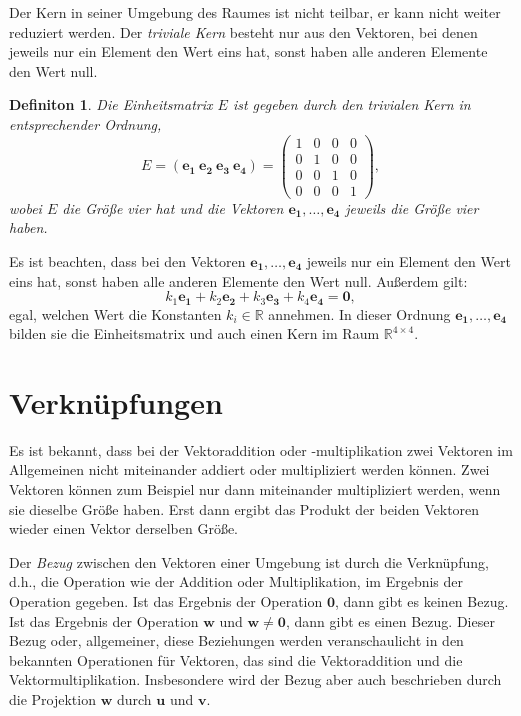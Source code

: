 \documentclass{report}
\newtheorem{definition}{Definiton}[section]
\numberwithin{equation}{section}
\begin{document}
Der Kern in seiner Umgebung des Raumes ist nicht teilbar, er kann nicht weiter reduziert werden. Der \textit{triviale Kern} besteht nur aus den Vektoren, bei denen jeweils nur ein Element den Wert eins hat, sonst haben alle anderen Elemente den Wert null.
\begin{definition}
	Die Einheitsmatrix $E$ ist gegeben durch den trivialen Kern in entsprechender Ordnung, $$ E = (\boldsymbol{e_1} \: \boldsymbol{e_2} \: \boldsymbol{e_3} \: \boldsymbol{e_4}) = 
	\begin{pmatrix}
		1 & 0 & 0 & 0 \\
		0 & 1 & 0 & 0 \\
		0 & 0 & 1 & 0 \\
		0 & 0 & 0 & 1
	\end{pmatrix},$$
wobei $E$ die Größe vier hat und die Vektoren $\boldsymbol{e_1}, \ldots, \boldsymbol{e_4}$  jeweils die Größe vier haben.
\end{definition}
Es ist beachten, dass bei den Vektoren $\boldsymbol{e_1}, \ldots, \boldsymbol{e_4}$ jeweils nur ein Element den Wert eins hat, sonst haben alle anderen Elemente den Wert null. Außerdem gilt:
$$ k_1\boldsymbol{e_1} + k_2\boldsymbol{e_2} + k_3\boldsymbol{e_3} + k_4\boldsymbol{e_4} = \boldsymbol{0},$$ egal, welchen Wert die Konstanten $k_i \in \mathbb{R} $ annehmen. In dieser Ordnung $\boldsymbol{e_1}, \ldots, \boldsymbol{e_4}$ bilden sie die Einheitsmatrix und auch einen Kern im Raum $\mathbb{R}^{4 \times 4}$. 

\section{Verknüpfungen}
\label{sec:verknüpfungen}
Es ist bekannt, dass bei der Vektoraddition oder -multiplikation zwei Vektoren im Allgemeinen nicht miteinander addiert oder multipliziert werden können. Zwei Vektoren können zum Beispiel nur dann miteinander multipliziert werden, wenn sie dieselbe Größe haben. Erst dann ergibt das Produkt der beiden Vektoren wieder einen Vektor derselben Größe.

Der \textit{Bezug} zwischen den Vektoren einer Umgebung ist durch die Verknüpfung, d.h., die Operation wie der Addition oder Multiplikation, im Ergebnis der Operation gegeben. Ist das Ergebnis der Operation $\boldsymbol{0}$, dann gibt es keinen Bezug. Ist das Ergebnis der Operation $\boldsymbol{w}$ und $\boldsymbol{w} \neq \boldsymbol{0}$, dann gibt es einen Bezug. Dieser Bezug oder, allgemeiner, diese Beziehungen werden veranschaulicht in den bekannten Operationen für Vektoren, das sind die Vektoraddition und die Vektormultiplikation. Insbesondere wird der Bezug aber auch beschrieben durch die Projektion $\boldsymbol{w}$ durch $\boldsymbol{u}$ und $\boldsymbol{v}$.
\end{document}
